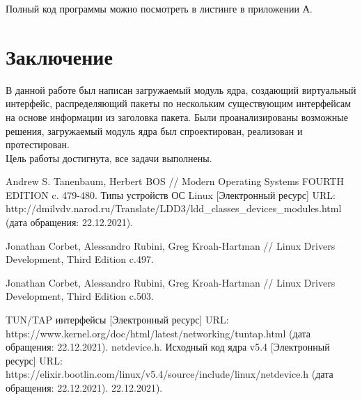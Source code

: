 \documentclass[14pt, a4paper]{extarticle}
\begin{document}
Полный код программы можно посмотреть в листинге в приложении А.

\clearpage
\section*{Заключение}

В данной работе был написан загружаемый модуль ядра, создающий виртуальный интерфейс, распределяющий пакеты по нескольким существующим интерфейсам на основе информации из заголовка пакета. Были проанализированы возможные решения, загружаемый модуль ядра был спроектирован, реализован и протестирован.\\
\indent Цель работы достигнута, все задачи выполнены.
\clearpage
\begin{thebibliography}{9}
	 Andrew S. Tanenbaum,
Herbert BOS //  Modern Operating Systems FOURTH EDITION c. 479-480.
	 Типы устройств ОС Linux [Электронный ресурс] URL: http://dmilvdv.narod.ru/Translate/LDD3/ldd\_classes\_devices\_modules.html (дата обращения: 22.12.2021).
	
	 Jonathan Corbet, Alessandro Rubini, Greg Kroah-Hartman // Linux Drivers Development, Third Edition c.497.
	
	 Jonathan Corbet, Alessandro Rubini, Greg Kroah-Hartman // Linux Drivers Development, Third Edition c.503.
	
	 TUN/TAP интерфейсы [Электронный ресурс] URL: https://www.kernel.org/doc/html/latest/networking/tuntap.html (дата обращения: 22.12.2021).
	 netdevice.h. Исходный код ядра v5.4 [Электронный ресурс] URL: https://elixir.bootlin.com/linux/v5.4/source/include/linux/netdevice.h (дата обращения: 22.12.2021). 22.12.2021).
\end{thebibliography}
\end{document}
